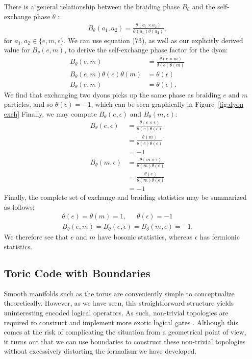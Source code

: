 \documentclass[12pt]{article}
\theoremstyle{definition}
\begin{document}
There is a general relationship between the braiding phase $B_\theta$ and the self-exchange phase $\theta$ \cite{ellison2022}:
    \begin{align}
        B_\theta(a_1,a_2) = \frac{\theta(a_1\times a_2)}{\theta(a_1)\theta(a_2)},
    \end{align}
for $a_1,a_2\in\{e,m,\epsilon\}$. We can use equation ($73$), as well as our explicitly derived value for $B_\theta(e,m)$, to derive the self-exchange phase factor for the dyon: 
    \begin{align}
        B_\theta(e,m) &= \frac{\theta(e\times m)}{\theta(e)\theta(m)}\\
        B_\theta(e,m)\theta(e)\theta(m) &= \theta(\epsilon)\\
        B_\theta(e,m) &= \theta(\epsilon).
    \end{align}
We find that exchanging two dyons picks up the same phase as braiding $e$ and $m$ particles, and so $\theta(\epsilon) = -1 $, which can be seen graphically in Figure~\ref{fig:dyon exch} Finally, we may compute $B_\theta(e,\epsilon)$ and $B_\theta(m,\epsilon)$:
    \begin{align}
        B_\theta(e,\epsilon) &= \frac{\theta(e\times\epsilon)}{\theta(e)\theta(\epsilon)}\\
        &= \frac{\theta(m)}{\theta(e)\theta(\epsilon)}\\
        &= -1\\
        B_\theta(m,\epsilon) &= \frac{\theta(m\times\epsilon)}{\theta(m)\theta(\epsilon)}\\
        &= \frac{\theta(e)}{\theta(m)\theta(\epsilon)}\\
        &= -1
    \end{align}
Finally, the complete set of exchange and braiding statistics may be summarized as follows:
    \begin{align}
        \theta(e) = \theta(m) = 1,\enspace\enspace\enspace\theta(\epsilon) = -1\\
        B_\theta(e,m) = B_\theta(e,\epsilon) = B_\theta(m,\epsilon) = -1.
    \end{align}
We therefore see that $e$ and $m$ have bosonic statistics, whereas $\epsilon$ has fermionic statistics. 

\subsection{Toric Code with Boundaries}
Smooth manifolds such as the torus are conveniently simple to conceptualize theoretically. However, as we have seen, this straightforward structure yields uninteresting encoded logical operators. As such, non-trivial topologies are required to construct and implement more exotic logical gates \cite{cheipesh2019}. Although this comes at the risk of complicating the situation from a geometrical point of view, it turns out that we can use boundaries to construct these non-trivial topologies without excessively distorting the formalism we have developed.\newline
\end{document}
